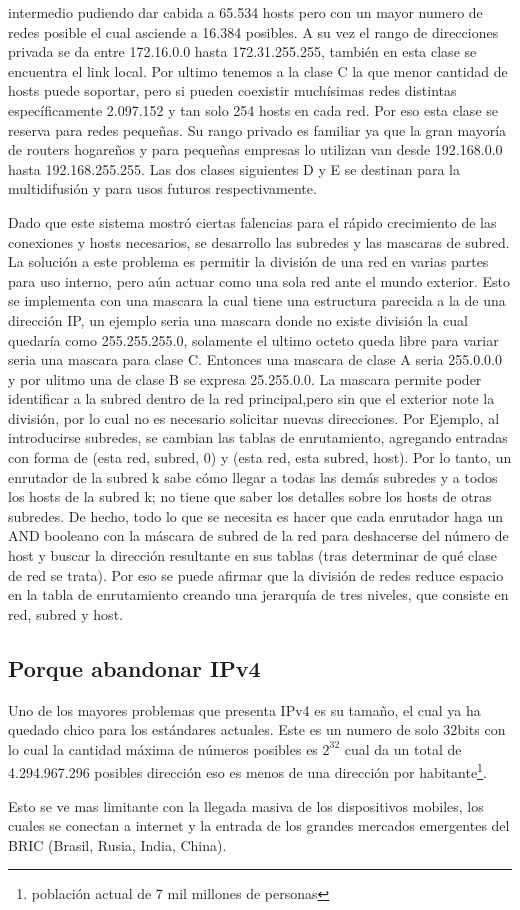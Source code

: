 \documentclass[11pt,a4paper]{article}
\begin{document}
intermedio pudiendo dar cabida a 65.534 hosts pero con un mayor numero de redes posible el cual 
asciende a 16.384 posibles. A su vez el rango de direcciones privada se da entre 172.16.0.0 hasta 
172.31.255.255, también en esta clase se encuentra el link local. Por ultimo tenemos a la clase C la
que menor cantidad de hosts puede soportar, pero si pueden coexistir muchísimas redes distintas 
específicamente 2.097.152 y tan solo 254 hosts en cada red. Por eso esta clase se reserva para redes 
pequeñas. Su rango privado es familiar ya que la gran mayoría de routers hogareños y para pequeñas 
empresas lo utilizan van desde 192.168.0.0 hasta 192.168.255.255. Las dos clases siguientes D y E se
destinan para la multidifusi\'on y para usos futuros respectivamente.\par
Dado que este sistema mostró ciertas falencias para el rápido crecimiento de las conexiones y hosts
necesarios, se desarrollo las subredes y las mascaras de subred. La solución a este problema es 
permitir la división de una red en varias partes para uso interno, pero aún actuar como una sola red 
ante el mundo exterior. Esto se implementa con una mascara la cual tiene una estructura parecida a
la de una dirección IP, un ejemplo seria una mascara donde no existe división la cual quedaría como 
255.255.255.0, solamente el ultimo octeto queda libre para variar seria una mascara para clase C. 
Entonces una mascara de clase A seria 255.0.0.0 y por ulitmo una de clase B se expresa 25.255.0.0. 
La mascara permite poder identificar a la subred dentro de la red principal,pero sin que el exterior 
note la división, por lo cual no es necesario solicitar nuevas direcciones. Por Ejemplo, al 
introducirse subredes, se cambian las tablas de enrutamiento, agregando entradas con forma de (esta 
red, subred, 0) y (esta red, esta subred, host). Por lo tanto, un enrutador de la subred k sabe cómo 
llegar a todas las demás subredes y a todos los hosts de la subred k; no tiene que saber los 
detalles sobre los hosts de otras subredes. De hecho, todo lo que se necesita es hacer que cada 
enrutador haga un AND booleano con la máscara de subred de la red para deshacerse del número de host 
y buscar la dirección resultante en sus tablas (tras determinar de qué clase de red se trata). Por 
eso se puede afirmar que la división de redes reduce espacio en la tabla de enrutamiento creando una 
jerarquía de tres niveles, que consiste en red, subred y host.


\subsection{Porque abandonar IPv4}
Uno de los mayores problemas que presenta IPv4 es su tamaño, el cual ya ha quedado chico para los
estándares actuales. Este es un numero de solo 32bits con lo cual la cantidad máxima de números
posibles es $2^{32}$ cual da un total de 4.294.967.296 posibles dirección eso es menos de una
dirección por habitante\footnote{población actual de 7 mil millones de personas}.\par
Esto se ve mas limitante con la llegada masiva de los dispositivos mobiles, los cuales se conectan
a internet y la entrada de los grandes mercados emergentes del BRIC (Brasil, Rusia, India, China).
 
\end{document}
